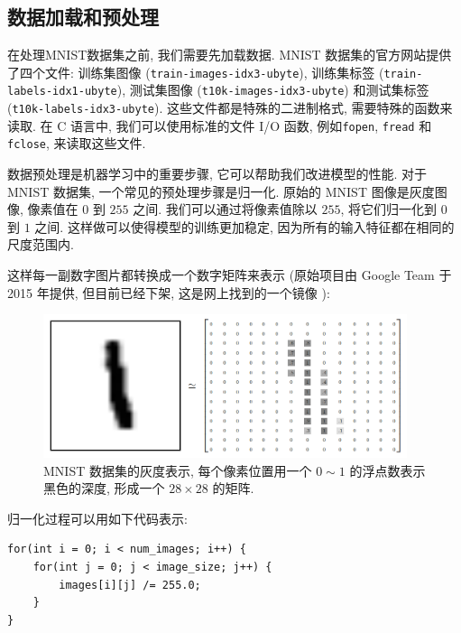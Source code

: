 \documentclass{ctexart}
\begin{document}
\subsection{数据加载和预处理}

在处理MNIST数据集之前, 我们需要先加载数据. MNIST 数据集的官方网站提供了四个文件: 训练集图像 (\verb|train-images-idx3-ubyte|),
训练集标签 (\verb|train-labels-idx1-ubyte|), 测试集图像 (\verb|t10k-images-idx3-ubyte|)
和测试集标签 (\verb|t10k-labels-idx3-ubyte|).
这些文件都是特殊的二进制格式, 需要特殊的函数来读取. 在 C 语言中, 我们可以使用标准的文件 I/O 函数,
例如\verb|fopen|, \verb|fread| 和 \verb|fclose|, 来读取这些文件.

数据预处理是机器学习中的重要步骤, 它可以帮助我们改进模型的性能. 对于 MNIST 数据集, 一个常见的预处理步骤是归一化.
原始的 MNIST 图像是灰度图像, 像素值在 $0$ 到 $255$ 之间. 我们可以通过将像素值除以 $255$, 将它们归一化到 $0$ 到 $1$ 之间.
这样做可以使得模型的训练更加稳定, 因为所有的输入特征都在相同的尺度范围内.


这样每一副数字图片都转换成一个数字矩阵来表示
(原始项目由 Google Team 于 2015 年提供, 但目前已经下架, 这是网上找到的一个镜像 \cite{tensorflow2015mnist}):

\begin{figure}[htbp!]
    \centering
    \includegraphics[width=0.95\textwidth]{images/MNIST-Matrix.png}
    \caption{MNIST 数据集的灰度表示, 每个像素位置用一个 $0 \sim 1$ 的浮点数表示黑色的深度,
        形成一个 $28 \times 28$ 的矩阵.}
    \label{fig:mnist_mateix}
\end{figure}

归一化过程可以用如下代码表示:

\begin{verbatim}  
for(int i = 0; i < num_images; i++) {  
    for(int j = 0; j < image_size; j++) {  
        images[i][j] /= 255.0;  
    }  
}  
\end{verbatim}  
\end{document}
